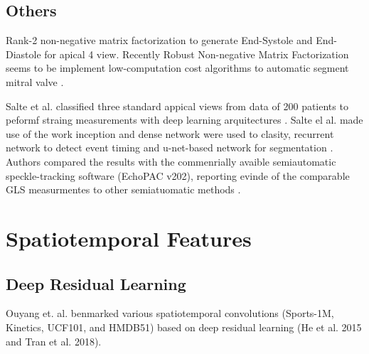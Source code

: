 \subsection{Others}
Rank-2 non-negative matrix factorization \cite{yuan2017} to generate End-Systole and End-Diastole for apical 4 view.  
Recently Robust Non-negative Matrix Factorization seems to be implement low-computation cost algorithms to automatic segment mitral valve \cite{dukler2018}.

Salte et al. classified three standard appical views from data of 200 patients to peformf straing measurements with deep learning arquitectures \cite{SALTE2021-JACC}.
Salte el al. made use of the work \cite{ostvik2021-TMI} inception and dense network were used to clasity, recurrent network to detect event timing and u-net-based network for segmentation \cite{SALTE2021-JACC}.
Authors compared the results with the commenrially avaible semiautomatic speckle-tracking software (EchoPAC v202), reporting evinde of the comparable GLS measurmentes to other semiatuomatic methods \cite{SALTE2021-JACC}.




\section{Spatiotemporal Features}


\subsection{Deep Residual Learning}
Ouyang et. al. benmarked various spatiotemporal convolutions (Sports-1M, Kinetics, UCF101, and HMDB51) \cite{ouyang-NeuripsML4H2019}  based on deep residual learning (He et al. 2015 and Tran et al. 2018).



